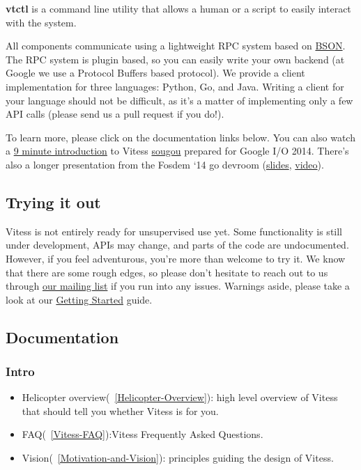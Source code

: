 \textbf{vtctl} is a command line utility that allows a human or a script to easily
interact with the system.

All components communicate using a lightweight RPC system based on
\href{http://bsonspec.org/}{BSON}. The RPC system is plugin based, so you can easily
write your own backend (at Google we use a Protocol Buffers based protocol). We
provide a client implementation for three languages: Python, Go, and Java.
Writing a client for your language should not be difficult, as it's a matter of
implementing only a few API calls (please send us a pull request if you do!).

To learn more, please click on the documentation links below.
You can also watch a \href{https://www.youtube.com/watch?v=midJ6b1LkA0}{9 minute introduction}
to Vitess \href{https://github.com/sougou}{sougou} prepared for Google I/O 2014.
There's also a longer presentation from the Fosdem `14 go devroom
(\href{https://github.com/youtube/vitess/blob/master/doc/Vitess2014.pdf?raw=true}{slides},
\href{http://youtu.be/qATTTSg6zXk}{video}).

\subsection{Trying it out}\hypertarget{trying-it-out}{}\label{trying-it-out}

Vitess is not entirely ready for unsupervised use yet. Some functionality is
still under development, APIs may change, and parts of the code are
undocumented. However, if you feel adventurous, you're more than welcome to try
it. We know that there are some rough edges, so please don't hesitate to reach out
to us through \href{https://groups.google.com/forum/\#!forum/vitess}{our mailing list}
if you run into any issues. Warnings aside, please take a look at our \href{https://github.com/youtube/vitess/blob/master/doc/GettingStarted.markdown}{Getting
Started}
guide.

\subsection{Documentation}\hypertarget{documentation}{}\label{documentation}

\subsubsection{Intro}\hypertarget{intro}{}\label{intro}

\begin{itemize}
\item Helicopter overview(~\ref{Helicopter-Overview}):  high level overview of Vitess that should tell you whether Vitess is for you.
\item FAQ(~\ref{Vitess-FAQ}):Vitess Frequently Asked Questions.
\item Vision(~\ref{Motivation-and-Vision}): principles guiding the design of Vitess.
\end{itemize}

